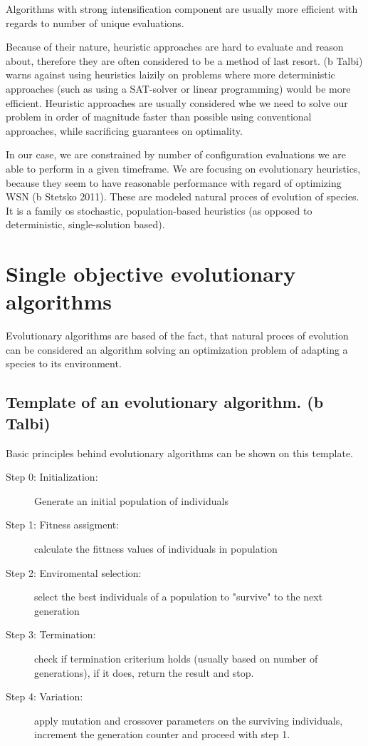 \documentclass[12pt,oneside]{fithesis2}
\begin{document}
Algorithms with strong intensification component are usually more efficient with regards to number of unique evaluations.


Because of their nature, heuristic approaches are hard to evaluate and reason about, therefore they are often considered to be a method of last resort. (b Talbi) warns against using heuristics laizily on problems where more deterministic approaches (such as using a SAT-solver or linear programming) would be more efficient. Heuristic approaches are usually considered whe we need to solve our problem in order of magnitude faster than possible using conventional approaches, while sacrificing guarantees on optimality.

In our case, we are constrained by number of configuration evaluations we are able to perform in a given timeframe. 
We are focusing on evolutionary heuristics, because they seem to have reasonable performance with regard of optimizing WSN (b Stetsko 2011). 
These are modeled natural proces of evolution of species. It is a family os stochastic, population-based heuristics (as opposed to deterministic, single-solution based). 

\section{Single objective evolutionary algorithms}

Evolutionary algorithms are based of the fact, that natural proces of evolution can be considered an algorithm solving an optimization problem of adapting a species to its environment. 

\subsection{Template of an evolutionary algorithm. (b Talbi)}
Basic principles behind evolutionary algorithms can be shown on this template. 
\begin{description}
	\item[Step 0: Initialization:] Generate an initial population of individuals
	\item[Step 1: Fitness assigment:] calculate the fittness values of individuals in population
	\item[Step 2: Enviromental selection:] select the best individuals of a population to "survive" to the next generation
	\item[Step 3: Termination:] check if termination criterium holds (usually based on number of generations), if it does, return the result and stop.
	\item[Step 4: Variation:] apply mutation and crossover parameters on the surviving individuals, increment the generation counter and proceed with step 1.
\end{description}
\end{document}
